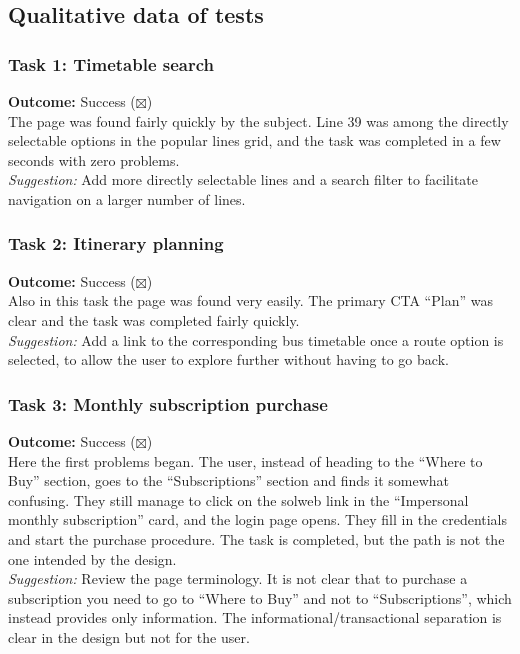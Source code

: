 ﻿\documentclass[11pt,a4paper]{article}
\begin{document}
\subsection*{Qualitative data of tests}
\begin{tcolorbox}[base]

\subsubsection*{Task 1: Timetable search}
\noindent\textbf{Outcome:} Success ($\boxtimes$)\\[0.2cm]
The page was found fairly quickly by the
subject. Line 39 was among the directly selectable
options in the popular lines grid, and the task
was completed in a few seconds with zero problems.\\[0.2cm]
\textit{Suggestion:} Add more directly selectable
lines and a search filter to facilitate
navigation on a larger number of lines.

\vspace{0.3cm}

\subsubsection*{Task 2: Itinerary planning}
\noindent\textbf{Outcome:} Success ($\boxtimes$)\\[0.2cm]
Also in this task the page was found very
easily. The primary CTA ``Plan'' was clear
and the task was completed fairly
quickly.\\[0.2cm]
\textit{Suggestion:} Add a link to the corresponding bus
timetable once a route option is selected,
to allow the user to explore further without having to go
back.

\vspace{0.3cm}

\subsubsection*{Task 3: Monthly subscription purchase}
\noindent\textbf{Outcome:} Success ($\boxtimes$)\\[0.2cm]
Here the first problems began. The user, instead of
heading to the ``Where to Buy'' section, goes to the
``Subscriptions'' section and finds it somewhat confusing.
They still manage to click on the solweb link in the
``Impersonal monthly subscription'' card, and the login
page opens. They fill in the credentials and start the
purchase procedure. The task is completed, but the path is
not the one intended by the design.\\[0.2cm]
\textit{Suggestion:} Review the page terminology.
It is not clear that to purchase a subscription you need to go
to ``Where to Buy'' and not to ``Subscriptions'', which instead
provides only information. The informational/transactional separation is
clear in the design but not for the user.


\end{tcolorbox}
\end{document}
